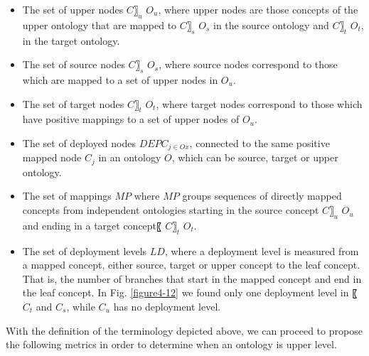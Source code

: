 \begin{itemize}
	\item 	The set of upper nodes $C〗_{u} $ \in  $O_{u} $, where upper nodes are those concepts of the upper ontology that are  mapped to $C〗_{s} $ \in  $O_{s} $ in the source ontology and  $C〗_{t} $ \in  $O_{t} $, in the target ontology.
	
	\item 	The set of source nodes $C〗_{s} $ \in  $O_{s} $, where source nodes correspond to those which are  mapped to a set of upper nodes in $O_{u}$. 
	
	\item 	The set of target nodes $C〗_{t} $ \in  $O_{t} $, where target nodes correspond to those which have positive mappings  to a set of upper nodes of $O_{u}$. 
	
	\item 	The set of deployed nodes $DEPC_{j \in O{x}}$, connected to the same positive mapped node $C_{j}$ in an ontology $O$, which can be source, target or upper ontology.
	
	\item 	The set of mappings $MP$ where $MP$ groups sequences of directly mapped concepts from independent ontologies starting in the source concept  $C〗_{u} $ \in  $O_{u} $ and ending in a target concept〖 $C〗_{t} $ \in  $O_{t} $. 
	
	\item 	The set of deployment levels $LD$, where a deployment level is measured from a mapped  concept, either source, target or upper concept to the leaf concept. That is, the number of branches that start in the mapped concept and end in the leaf concept. In Fig. \ref{figure4-12} we found only one deployment level in 〖$C_{t} $ and  $C_{s}$, while $C_{u}$ has no deployment level. 
	
\end{itemize}

With the definition of the terminology depicted above, we can proceed to propose the following metrics in order to determine when an ontology is upper level. 

